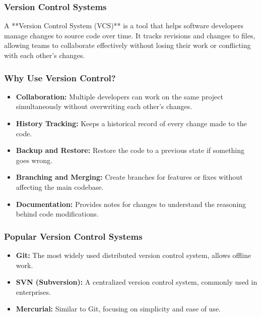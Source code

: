\documentclass{beamer}
\begin{document}
\begin{frame}[fragile]
    \frametitle{Version Control Systems}
    A **Version Control System (VCS)** is a tool that helps software developers manage changes to source code over time. It tracks revisions and changes to files, allowing teams to collaborate effectively without losing their work or conflicting with each other's changes.
\end{frame}

\begin{frame}[fragile]
    \frametitle{Why Use Version Control?}
    \begin{itemize}
        \item \textbf{Collaboration:} Multiple developers can work on the same project simultaneously without overwriting each other's changes.
        \item \textbf{History Tracking:} Keeps a historical record of every change made to the code.
        \item \textbf{Backup and Restore:} Restore the code to a previous state if something goes wrong.
        \item \textbf{Branching and Merging:} Create branches for features or fixes without affecting the main codebase.
        \item \textbf{Documentation:} Provides notes for changes to understand the reasoning behind code modifications.
    \end{itemize}
\end{frame}

\begin{frame}[fragile]
    \frametitle{Popular Version Control Systems}
    \begin{itemize}
        \item \textbf{Git:} The most widely used distributed version control system, allows offline work.
        \item \textbf{SVN (Subversion):} A centralized version control system, commonly used in enterprises.
        \item \textbf{Mercurial:} Similar to Git, focusing on simplicity and ease of use.
    \end{itemize}
\end{frame}
\end{document}
